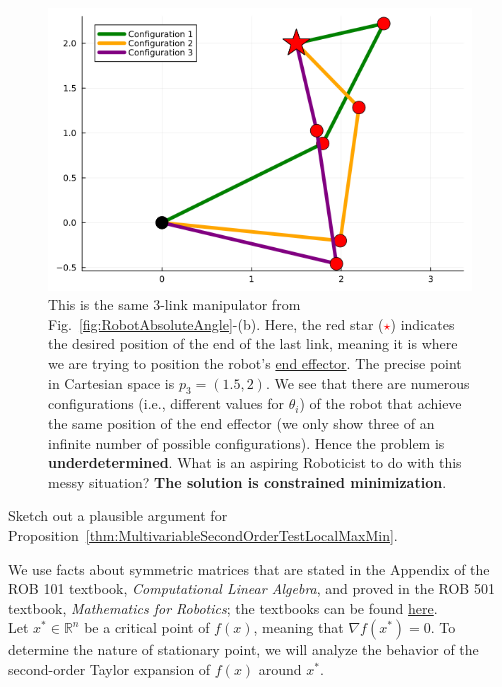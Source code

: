 \begin{figure}[ht]%
\centering
\includegraphics[width=0.6\columnwidth]{graphics/Chap06/constrainedOptimizationForRobotKinematicChain.png}%
    \caption[]{This is the same 3-link manipulator from Fig.~\ref{fig:RobotAbsoluteAngle}-(b). Here, the red star  (\textcolor{red}{\Huge $\star$}) indicates the desired position of the end of the last link, meaning it is where we are trying to position the robot's \href{https://en.wikipedia.org/wiki/Robot_end_effector}{end effector}. The precise point in Cartesian space is $p_3 = (1.5, 2)$. We see that there are numerous configurations (i.e., different values for $\theta_i$) of the robot that achieve the same position of the end effector (we only show three of an infinite number of possible configurations). Hence the problem is \textbf{underdetermined}. What is an aspiring Roboticist to do with this messy situation? \textbf{The solution is constrained minimization}.}
    \label{fig:robotKinematicsConstrainedOptimization}
\end{figure}

\bigskip

\begin{example} Sketch out a plausible argument for Proposition~\ref{thm:MultivariableSecondOrderTestLocalMaxMin}.    
\end{example}

\solution We use facts about symmetric matrices that are stated in the Appendix of the ROB 101 textbook, \textit{Computational Linear Algebra}, and proved in the ROB 501 textbook, \textit{Mathematics for Robotics}; the textbooks can be found \href{https://grizzle.robotics.umich.edu/education}{here}.  \\


Let $x^\ast \in \mathbb{R}^n$ be a critical point of $f(x)$, meaning that $\nabla f(x^\ast) = 0$. To determine the nature of stationary point, we will analyze the behavior of the second-order Taylor expansion of $f(x)$ around $x^\ast$. \\

